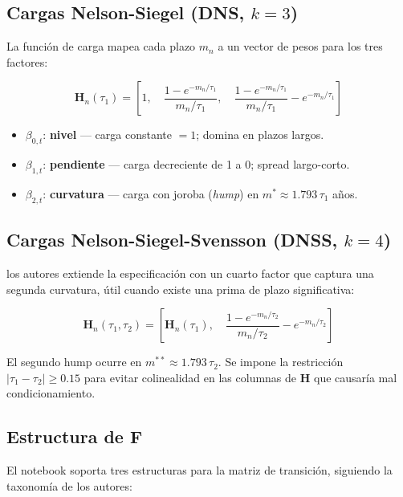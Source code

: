 \documentclass[12pt, a4paper]{article}
\theoremstyle{plain}
\theoremstyle{definition}
\theoremstyle{remark}
\newcommand{\bH}{\mathbf{H}}
\newcommand{\bF}{\mathbf{F}}
\begin{document}
\subsection{Cargas Nelson-Siegel (DNS, $k=3$)}

La función de carga mapea cada plazo $m_n$ a un vector de pesos para los tres factores:

\begin{equation}
  \bH_n(\tau_1) = \left[1, \quad
    \frac{1-e^{-m_n/\tau_1}}{m_n/\tau_1}, \quad
    \frac{1-e^{-m_n/\tau_1}}{m_n/\tau_1} - e^{-m_n/\tau_1}
  \right]
  \label{eq:ns_loadings}
\end{equation}

\begin{itemize}[leftmargin=1.5em]
  \item $\beta_{0,t}$: \textbf{nivel} — carga constante $= 1$; domina en plazos largos.
  \item $\beta_{1,t}$: \textbf{pendiente} — carga decreciente de 1 a 0; spread largo-corto.
  \item $\beta_{2,t}$: \textbf{curvatura} — carga con joroba (\emph{hump}) en
        $m^* \approx 1.793\,\tau_1$ años.
\end{itemize}

\subsection{Cargas Nelson-Siegel-Svensson (DNSS, $k=4$)}

los autores extiende la especificación con un cuarto factor que captura
una segunda curvatura, útil cuando existe una prima de plazo significativa:

\begin{equation}
  \bH_n(\tau_1,\tau_2) = \left[\bH_n(\tau_1), \quad
    \frac{1-e^{-m_n/\tau_2}}{m_n/\tau_2} - e^{-m_n/\tau_2}
  \right]
  \label{eq:nss_loadings}
\end{equation}

El segundo hump ocurre en $m^{**} \approx 1.793\,\tau_2$. Se impone la
restricción $|\tau_1 - \tau_2| \geq 0.15$ para evitar colinealidad en las
columnas de $\bH$ que causaría mal condicionamiento.

\subsection{Estructura de $\bF$}

El notebook soporta tres estructuras para la matriz de transición,
siguiendo la taxonomía de los autores:
\end{document}
